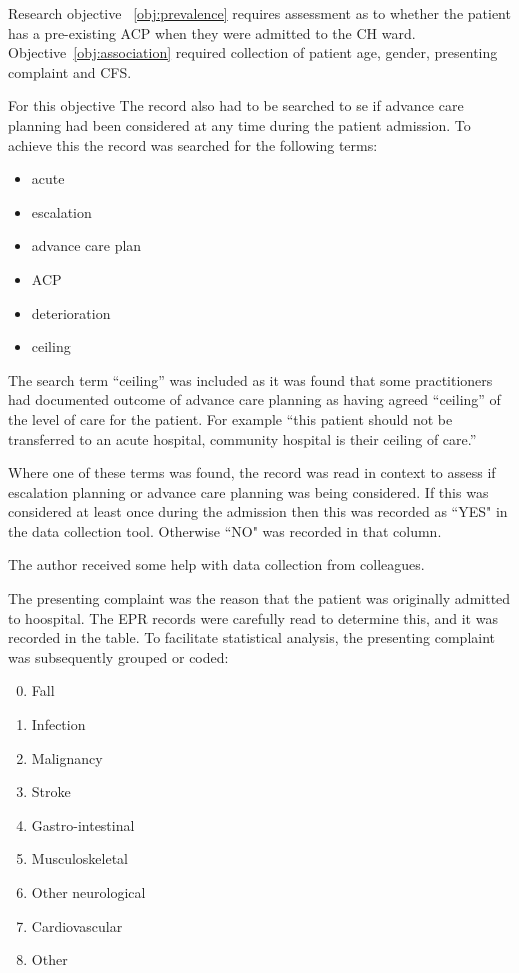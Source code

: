 \documentclass
[
	12pt,
	a4paper,
	oneside,
]{report}
\begin{document}
Research objective~
\ref{obj:prevalence} requires assessment as to whether the patient has a
pre-existing ACP when they were admitted to the CH ward. 
Objective~\ref{obj:association} required collection of patient age, gender,
presenting complaint and CFS. 

For this objective The record also had to be searched to se if advance care
planning had been considered at any time during the patient admission. To 
achieve this the record was searched for the following terms:

\begin{itemize}
\item acute
\item escalation
\item advance care plan
\item ACP
\item deterioration
\item ceiling
\end{itemize}

The search term ``ceiling'' was included as it was found that some practitioners
had documented outcome of advance care planning as having agreed ``ceiling'' of
the level of care for the patient. For example ``this patient should not be
transferred to an acute hospital, community hospital is their ceiling of care.''

Where one of these terms was found, the record was read in context to assess if 
escalation planning or advance care planning was being considered. If this
was considered at least once during the admission then this was recorded as 
``YES"
in the data collection tool. Otherwise ``NO" was recorded in that column.

The author received some help with data collection from colleagues.

The presenting complaint was the reason that the patient was originally 
admitted to hoospital. The EPR records were carefully read to determine this,
and it was recorded in the table. To facilitate statistical analysis, the 
presenting complaint was subsequently grouped or coded:
\begin{enumerate}
\setcounter{enumi}{-1}
\item Fall
\item Infection
\item Malignancy
\item Stroke
\item Gastro-intestinal
\item Musculoskeletal
\item Other neurological
\item Cardiovascular
\item Other
\end{enumerate}
\end{document}
